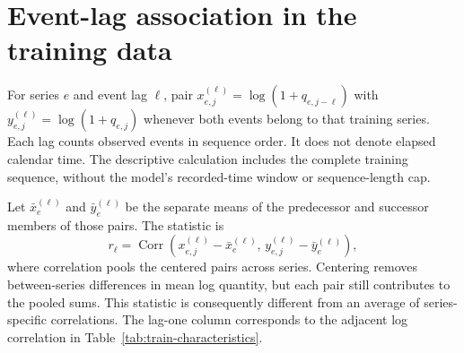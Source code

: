 \section{Event-lag association in the training data}
\label{app:lag}
For series $e$ and event lag $\ell$, pair
$x^{(\ell)}_{e,j}=\log(1+q_{e,j-\ell})$ with
$y^{(\ell)}_{e,j}=\log(1+q_{e,j})$ whenever both events belong to that
training series. Each lag counts observed events in sequence order.
It does not denote elapsed calendar time. The descriptive calculation
includes the complete training sequence, without the model's recorded-time
window or sequence-length cap.

Let $\bar x_e^{(\ell)}$ and $\bar y_e^{(\ell)}$ be the separate means
of the predecessor and successor members of those pairs. The statistic is
\begin{equation}
 r_{\ell}=\operatorname{Corr}\!\left(
 x^{(\ell)}_{e,j}-\bar x_e^{(\ell)},\,
 y^{(\ell)}_{e,j}-\bar y_e^{(\ell)}\right),
 \label{eq:train-lag-correlation}
\end{equation}
where correlation pools the centered pairs across series. Centering removes
between-series differences in mean log quantity, but each pair still
contributes to the pooled sums. This statistic is consequently different
from an average of series-specific correlations. The lag-one column
corresponds to the adjacent log correlation in
Table~\ref{tab:train-characteristics}.

